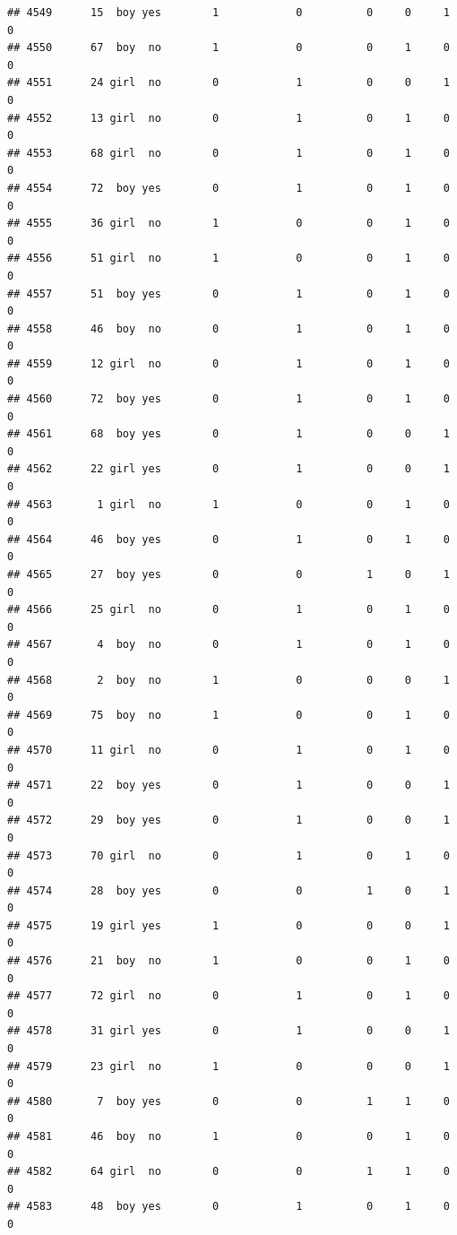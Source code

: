 \documentclass[man]{apa6}
\begin{document}
\begin{verbatim}
## 4549      15  boy yes        1            0          0     0     1     0
## 4550      67  boy  no        1            0          0     1     0     0
## 4551      24 girl  no        0            1          0     0     1     0
## 4552      13 girl  no        0            1          0     1     0     0
## 4553      68 girl  no        0            1          0     1     0     0
## 4554      72  boy yes        0            1          0     1     0     0
## 4555      36 girl  no        1            0          0     1     0     0
## 4556      51 girl  no        1            0          0     1     0     0
## 4557      51  boy yes        0            1          0     1     0     0
## 4558      46  boy  no        0            1          0     1     0     0
## 4559      12 girl  no        0            1          0     1     0     0
## 4560      72  boy yes        0            1          0     1     0     0
## 4561      68  boy yes        0            1          0     0     1     0
## 4562      22 girl yes        0            1          0     0     1     0
## 4563       1 girl  no        1            0          0     1     0     0
## 4564      46  boy yes        0            1          0     1     0     0
## 4565      27  boy yes        0            0          1     0     1     0
## 4566      25 girl  no        0            1          0     1     0     0
## 4567       4  boy  no        0            1          0     1     0     0
## 4568       2  boy  no        1            0          0     0     1     0
## 4569      75  boy  no        1            0          0     1     0     0
## 4570      11 girl  no        0            1          0     1     0     0
## 4571      22  boy yes        0            1          0     0     1     0
## 4572      29  boy yes        0            1          0     0     1     0
## 4573      70 girl  no        0            1          0     1     0     0
## 4574      28  boy yes        0            0          1     0     1     0
## 4575      19 girl yes        1            0          0     0     1     0
## 4576      21  boy  no        1            0          0     1     0     0
## 4577      72 girl  no        0            1          0     1     0     0
## 4578      31 girl yes        0            1          0     0     1     0
## 4579      23 girl  no        1            0          0     0     1     0
## 4580       7  boy yes        0            0          1     1     0     0
## 4581      46  boy  no        1            0          0     1     0     0
## 4582      64 girl  no        0            0          1     1     0     0
## 4583      48  boy yes        0            1          0     1     0     0

\end{verbatim}
\end{document}
